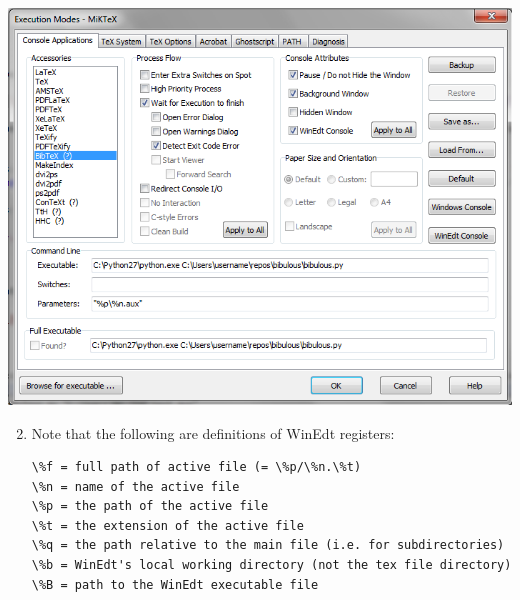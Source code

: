 \documentclass[letterpaper,10pt,english]{sphinxmanual}
\begin{document}
\includegraphics[width=0.490\linewidth]{modified_Winedt5_setup.png}
\begin{enumerate}
\setcounter{enumi}{1}
\item {} 
Note that the following are definitions of WinEdt registers:

\begin{Verbatim}[commandchars=\\\{\}]
\%f = full path of active file (= \%p/\%n.\%t)
\%n = name of the active file
\%p = the path of the active file
\%t = the extension of the active file
\%q = the path relative to the main file (i.e. for subdirectories)
\%b = WinEdt's local working directory (not the tex file directory)
\%B = path to the WinEdt executable file
\end{Verbatim}

\end{enumerate}
\end{document}
